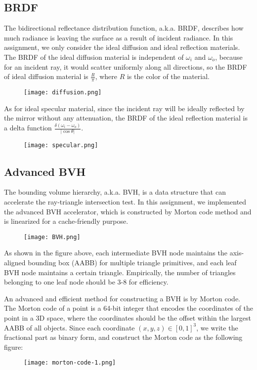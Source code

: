 \documentclass[acmtog]{acmart}
\begin{document}
\subsection{BRDF}
\hspace{8pt}
The bidirectional reflectance distribution function, a.k.a. BRDF, describes how much radiance is leaving the surface as a result of incident radiance. In this assignment, we only consider the ideal diffusion and ideal reflection materials. The BRDF of the ideal diffusion material is independent of $\omega_i$ and $\omega_o$, because for an incident ray, it would scatter uniformly along all directions, so the BRDF of ideal diffusion material is $\frac{R}{\pi}$, where $R$ is the color of the material.
\begin{figure}[htbp]
    \centering
    \texttt{[image: diffusion.png]}
\end{figure}

As for ideal specular material, since the incident ray will be ideally reflected by the mirror without any attenuation, the BRDF of the ideal reflection material is a delta function $\frac{\delta(\omega_i-\omega_o)}{|\cos\theta|}$.
\begin{figure}[htbp]
    \centering
    \texttt{[image: specular.png]}
\end{figure}

\pagebreak

\subsection{Advanced BVH}
\hspace{8pt}
The bounding volume hierarchy, a.k.a. BVH, is a data structure that can accelerate the ray-triangle intersection test. In this assignment, we implemented the advanced BVH accelerator, which is constructed by Morton code method and is linearized for a cache-friendly purpose.
\begin{figure}[htbp]
    \centering
    \texttt{[image: BVH.png]}
\end{figure}

As shown in the figure above, each intermediate BVH node maintains the axis-aligned bounding box (AABB) for multiple triangle primitives, and each leaf BVH node maintains a certain triangle. Empirically, the number of triangles belonging to one leaf node should be 3-8 for efficiency.

An advanced and efficient method for constructing a BVH is by Morton code. The Morton code of a point is a 64-bit integer that encodes the coordinates of the point in a 3D space, where the coordinates should be the offset within the largest AABB of all objects. Since each coordinate $(x,y,z)\in[0,1]^3$, we write the fractional part as binary form, and construct the Morton code as the following figure:
\begin{figure}[htbp]
    \centering
    \texttt{[image: morton-code-1.png]}
\end{figure}
\end{document}
